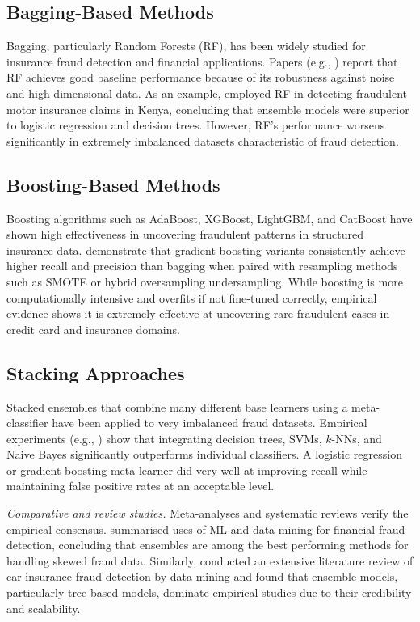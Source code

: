 \documentclass[12pt,a4paper,oneside]{report}
\numberwithin{equation}{chapter}
\begin{document}
\subsection{Bagging-Based Methods}

Bagging, particularly Random Forests (RF), has been widely studied for insurance fraud detection
and financial applications. Papers (e.g., \cite{Ming2024,njeru2022detection}) report that RF
achieves good baseline performance because of its robustness against noise and high-dimensional
data. As an example, \cite{njeru2022detection} employed RF in detecting fraudulent motor insurance
claims in Kenya, concluding that ensemble models were superior to logistic regression and decision
trees. However, RF's performance worsens significantly in extremely imbalanced datasets
characteristic of fraud detection.

\subsection{Boosting-Based Methods}

Boosting algorithms such as AdaBoost, XGBoost, LightGBM, and CatBoost have shown high
effectiveness in uncovering fraudulent patterns in structured insurance data.
\cite{Khalid2024,Scrivano2024} demonstrate that gradient boosting variants consistently achieve
higher recall and precision than bagging when paired with resampling methods such as SMOTE or
hybrid oversampling undersampling. While boosting is more computationally intensive and overfits
if not fine-tuned correctly, empirical evidence shows it is extremely effective at uncovering rare
fraudulent cases in credit card and insurance domains.

\subsection{Stacking Approaches}

Stacked ensembles that combine many different base learners using a meta-classifier have been
applied to very imbalanced fraud datasets. Empirical experiments (e.g., \cite{Eteng2025,zhang2024fraud})
show that integrating decision trees, SVMs, $k$-NNs, and Naive Bayes significantly outperforms
individual classifiers. A logistic regression or gradient boosting meta-learner did very well at
improving recall while maintaining false positive rates at an acceptable level.

\noindent\textit{Comparative and review studies.} Meta-analyses and systematic reviews verify
the empirical consensus.  summarised uses of ML and data mining for financial
fraud detection, concluding that ensembles are among the best performing methods for handling
skewed fraud data. Similarly, \cite{schrijver2024automobile} conducted an extensive literature
review of car insurance fraud detection by data mining and found that ensemble models, particularly
tree-based models, dominate empirical studies due to their credibility and scalability.
\end{document}
